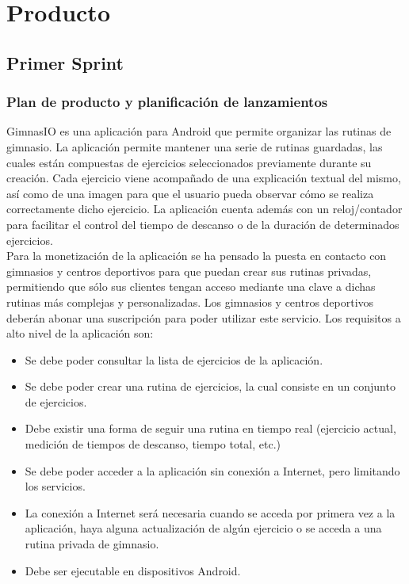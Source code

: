 \documentclass[11pt,a4paper]{report}
\begin{document}
\chapter{Producto}
\section{Primer Sprint}
\subsection{Plan de producto y planificación de lanzamientos}\label{s:prod1}
GimnasIO es una aplicación para Android que permite organizar las rutinas de gimnasio. La aplicación permite mantener una serie de rutinas guardadas, las cuales están compuestas de ejercicios seleccionados previamente durante su creación. Cada ejercicio viene acompañado de una explicación textual del mismo, así como de una imagen para que el usuario pueda observar cómo se realiza correctamente dicho ejercicio. La aplicación cuenta además con un reloj/contador para facilitar el control del tiempo de descanso o de la duración de determinados ejercicios.
\\Para la monetización de la aplicación se ha pensado la puesta en contacto con gimnasios y centros deportivos para que puedan crear sus rutinas privadas, permitiendo que sólo sus clientes tengan acceso mediante una clave a dichas rutinas más complejas y personalizadas. Los gimnasios y centros deportivos deberán abonar una suscripción para poder utilizar este servicio.
\newline Los requisitos a alto nivel de la aplicación son:
\begin{itemize}
	\item Se debe poder consultar la lista de ejercicios de la aplicación.
	\item Se debe poder crear una rutina de ejercicios, la cual consiste en un conjunto de ejercicios.
	\item Debe existir una forma de seguir una rutina en tiempo real (ejercicio actual, medición de tiempos de
	descanso, tiempo total, etc.)
	\item Se debe poder acceder a la aplicación sin conexión a Internet, pero limitando los servicios.
	\item La conexión a Internet será necesaria cuando se acceda por primera vez a la aplicación, haya alguna
	actualización de algún ejercicio o se acceda a una rutina privada de gimnasio.	
	\item Debe ser ejecutable en dispositivos Android.
\end{itemize}
\end{document}
